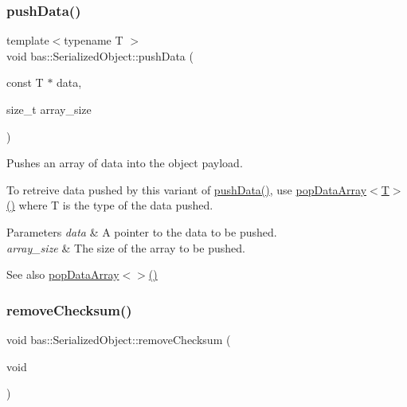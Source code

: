 \subsubsection{\texorpdfstring{pushData()}{pushData()}\hspace{0.1cm}{\footnotesize\ttfamily [2/2]}}
{\footnotesize\ttfamily template$<$typename T $>$ \\
void bas\+::\+Serialized\+Object\+::push\+Data (\begin{DoxyParamCaption}\item[{const T $\ast$}]{data,  }\item[{size\+\_\+t}]{array\+\_\+size }\end{DoxyParamCaption})\hspace{0.3cm}{\ttfamily [inline]}}



Pushes an array of data into the object payload. 

To retreive data pushed by this variant of \mbox{\hyperlink{classbas_1_1SerializedObject_ae6d94b4b6c3d77dad3aab140ea6f7ca1}{push\+Data()}}, use \mbox{\hyperlink{classbas_1_1SerializedObject_a700a5ad3f53a5e12e51321f29e79e422}{pop\+Data\+Array$<$\+T$>$()}} where T is the type of the data pushed. 
\begin{DoxyParams}{Parameters}
{\em data} & A pointer to the data to be pushed. \\
\hline
{\em array\+\_\+size} & The size of the array to be pushed. \\
\hline
\end{DoxyParams}
\begin{DoxySeeAlso}{See also}
\mbox{\hyperlink{classbas_1_1SerializedObject_a700a5ad3f53a5e12e51321f29e79e422}{pop\+Data\+Array$<$$>$()}} 
\end{DoxySeeAlso}
\mbox{\label{classbas_1_1SerializedObject_a1cb43a946e9f7000eb2b24586a91ad3b}} 
\subsubsection{\texorpdfstring{removeChecksum()}{removeChecksum()}}
{\footnotesize\ttfamily void bas\+::\+Serialized\+Object\+::remove\+Checksum (\begin{DoxyParamCaption}\item[{void}]{ }\end{DoxyParamCaption})\hspace{0.3cm}{\ttfamily [inline]}}



